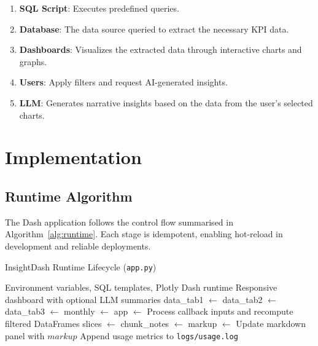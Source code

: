 \documentclass[12pt,a4paper]{article}
\begin{document}
\begin{enumerate}
\item \textbf{SQL Script}: Executes predefined queries.
\item \textbf{Database}: The data source queried to extract the necessary KPI data.
\item \textbf{Dashboards}: Visualizes the extracted data through interactive charts and graphs.
\item \textbf{Users}: Apply filters and request AI-generated insights.
\item \textbf{LLM}: Generates narrative insights based on the data from the user's selected charts.
\end{enumerate}

\section{Implementation}
\subsection{Runtime Algorithm}

The Dash application follows the control flow summarised in Algorithm~\ref{alg:runtime}. Each stage is idempotent, enabling hot-reload in development and reliable deployments.

\begin{algorithm}[H]
\caption{InsightDash Runtime Lifecycle (\texttt{app.py})}
\label{alg:runtime}
\begin{algorithmic}[1]
\Require Environment variables, SQL templates, Plotly Dash runtime
\Ensure Responsive dashboard with optional LLM summaries
\State {}
\State data\_tab1 $\gets$ 
\State data\_tab2 $\gets$ 
\State data\_tab3 $\gets$ 
\State monthly $\gets$ 
\State app $\gets$ 
    \State Process callback inputs and recompute filtered DataFrames
        \State slices $\gets$ 
        \State chunk\_notes $\gets$ 
        \State markup $\gets$ 
        \State Update markdown panel with $markup$
    \EndIf
    \State Append usage metrics to \texttt{logs/usage.log}
\EndWhile
\end{algorithmic}
\end{algorithm}
\end{document}
